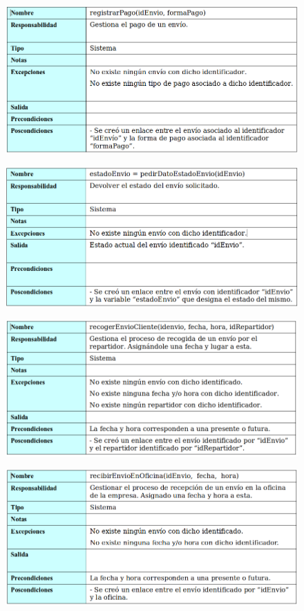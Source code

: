 \begin{figure}[H]
	\centering
	\includegraphics[width=16cm]{34}
\end{figure}
\begin{figure}[H]
	\centering
	\includegraphics[width=16cm]{35}
\end{figure}
\begin{figure}[H]
	\centering
	\includegraphics[width=16cm]{36}
\end{figure}
\begin{figure}[H]
	\centering
	\includegraphics[width=16cm]{37}
\end{figure}

